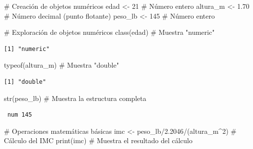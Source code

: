 \documentclass[
  spanish,
  a4paper,
  DIV=11,
  numbers=noendperiod,
  onepage,
  openany]{scrreprt}
\newenvironment{Shaded}{\begin{snugshade}}{\end{snugshade}}
\newcommand{\CommentTok}[1]{\textcolor[rgb]{0.37,0.37,0.37}{#1}}
\newcommand{\DecValTok}[1]{\textcolor[rgb]{0.68,0.00,0.00}{#1}}
\newcommand{\FloatTok}[1]{\textcolor[rgb]{0.68,0.00,0.00}{#1}}
\newcommand{\FunctionTok}[1]{\textcolor[rgb]{0.28,0.35,0.67}{#1}}
\newcommand{\NormalTok}[1]{\textcolor[rgb]{0.00,0.23,0.31}{#1}}
\newcommand{\OtherTok}[1]{\textcolor[rgb]{0.00,0.23,0.31}{#1}}
\newcommand{\SpecialCharTok}[1]{\textcolor[rgb]{0.37,0.37,0.37}{#1}}
\begin{document}
\begin{Shaded}
\begin{Highlighting}[]
\CommentTok{\# Creación de objetos numéricos}
\NormalTok{edad }\OtherTok{\textless{}{-}} \DecValTok{21}        \CommentTok{\# Número entero}
\NormalTok{altura\_m }\OtherTok{\textless{}{-}} \FloatTok{1.70}  \CommentTok{\# Número decimal (punto flotante)}
\NormalTok{peso\_lb }\OtherTok{\textless{}{-}} \DecValTok{145}    \CommentTok{\# Número entero}

\CommentTok{\# Exploración de objetos numéricos}
\FunctionTok{class}\NormalTok{(edad)      }\CommentTok{\# Muestra "numeric"}
\end{Highlighting}
\end{Shaded}

\begin{verbatim}
[1] "numeric"
\end{verbatim}

\begin{Shaded}
\begin{Highlighting}[]
\FunctionTok{typeof}\NormalTok{(altura\_m)  }\CommentTok{\# Muestra "double"}
\end{Highlighting}
\end{Shaded}

\begin{verbatim}
[1] "double"
\end{verbatim}

\begin{Shaded}
\begin{Highlighting}[]
\FunctionTok{str}\NormalTok{(peso\_lb)     }\CommentTok{\# Muestra la estructura completa}
\end{Highlighting}
\end{Shaded}

\begin{verbatim}
 num 145
\end{verbatim}

\begin{Shaded}
\begin{Highlighting}[]
\CommentTok{\# Operaciones matemáticas básicas}
\NormalTok{imc }\OtherTok{\textless{}{-}}\NormalTok{ peso\_lb}\SpecialCharTok{/}\FloatTok{2.2046}\SpecialCharTok{/}\NormalTok{(altura\_m}\SpecialCharTok{\^{}}\DecValTok{2}\NormalTok{)  }\CommentTok{\# Cálculo del IMC}
\FunctionTok{print}\NormalTok{(imc)  }\CommentTok{\# Muestra el resultado del cálculo}
\end{Highlighting}
\end{Shaded}
\end{document}
